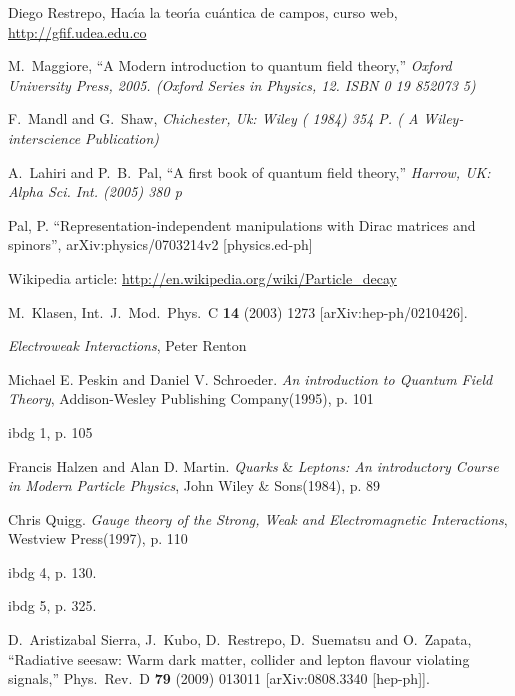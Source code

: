 \begin{thebibliography}{99}
 Diego Restrepo, Hac\'\i a la teor\'\i a cu\'antica de campos, curso web, \url{http://gfif.udea.edu.co}

  M.~Maggiore,
  ``A Modern introduction to quantum field theory,''
{\it  Oxford University Press, 2005. (Oxford Series in Physics, 12. ISBN 0 19 852073 5)}

  F.~Mandl and G.~Shaw,
{\it  Chichester, Uk: Wiley ( 1984) 354 P. ( A Wiley-interscience Publication)}

  A.~Lahiri and P.~B.~Pal,
  ``A first book of quantum field theory,''
{\it  Harrow, UK: Alpha Sci. Int. (2005) 380 p}

 Pal, P. ``Representation-independent manipulations with Dirac matrices and spinors'',
	arXiv:physics/0703214v2 [physics.ed-ph]

 Wikipedia article: \url{http://en.wikipedia.org/wiki/Particle_decay}

  M.~Klasen,
  Int.\ J.\ Mod.\ Phys.\  C {\bf 14} (2003) 1273
  [arXiv:hep-ph/0210426].

 \emph{Electroweak Interactions}, Peter Renton


Michael E. Peskin and Daniel V. Schroeder. \emph{An introduction to
Quantum Field Theory}, Addison-Wesley Publishing Company(1995), p.
101

ibdg 1, p. 105

Francis Halzen and Alan D. Martin. \emph{Quarks} \& \emph{Leptons:
An introductory Course in Modern Particle Physics}, John Wiley \&
Sons(1984), p. 89

Chris Quigg. \emph{Gauge theory of the Strong, Weak and
Electromagnetic Interactions}, Westview Press(1997), p. 110


ibdg 4, p. 130.

ibdg 5, p. 325.


  D.~Aristizabal Sierra, J.~Kubo, D.~Restrepo, D.~Suematsu and O.~Zapata,
  ``Radiative seesaw: Warm dark matter, collider and lepton flavour violating
  signals,''
  Phys.\ Rev.\  D {\bf 79} (2009) 013011
  [arXiv:0808.3340 [hep-ph]].


\end{thebibliography}
